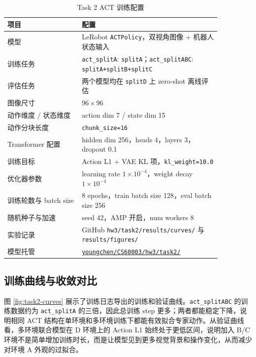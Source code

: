 \documentclass[lang=cn,a4paper,newtx,nofont,code=minted]{elegantpaper}
\begin{document}
\begin{table}[!htbp]
\centering
\small
\caption{Task 2 ACT 训练配置}
\label{tab:task2-config}
\begin{tabular}{@{}L{0.30\linewidth}L{0.56\linewidth}@{}}
\toprule
项目 & 配置 \\
\midrule
模型 & LeRobot \texttt{ACTPolicy}，双视角图像 + 机器人状态输入 \\
训练任务 & \texttt{act\_splitA}: \texttt{splitA}；\texttt{act\_splitABC}: \texttt{splitA+splitB+splitC} \\
评估任务 & 两个模型均在 \texttt{splitD} 上 zero-shot 离线评估 \\
图像尺寸 & $96\times96$ \\
动作维度 / 状态维度 & action dim 7 / state dim 15 \\
动作分块长度 & \texttt{chunk\_size=16} \\
Transformer 配置 & hidden dim 256，heads 4，layers 3，dropout 0.1 \\
训练目标 & Action L1 + VAE KL 项，\texttt{kl\_weight=10.0} \\
优化器参数 & learning rate $1\times10^{-4}$，weight decay $1\times10^{-4}$ \\
训练轮数与 batch size & 8 epochs，train batch size 128，eval batch size 256 \\
随机种子与加速 & seed 42，AMP 开启，num workers 8 \\
实验记录 & GitHub \texttt{hw3/task2/results/curves/} 与 \texttt{results/figures/} \\
模型托管 & \href{https://modelscope.cn/models/youngchen/CS60003/tree/master/hw3/task2}{\texttt{youngchen/CS60003/hw3/task2/}} \\
\bottomrule
\end{tabular}
\end{table}

\subsection{训练曲线与收敛对比}

图 \ref{fig:task2-curves} 展示了训练日志导出的训练和验证曲线。\texttt{act\_splitABC} 的训练数据约为 \texttt{act\_splitA} 的三倍，因此总训练 step 更多；两者都能稳定下降，说明相同 ACT 结构在单环境和多环境训练下都能有效拟合专家动作。从验证曲线看，多环境联合模型在 D 环境上的 Action L1 始终处于更低区间，说明加入 B/C 环境不是简单增加训练时长，而是让模型见到更多视觉背景和操作变化，从而减少对环境 A 外观的过拟合。
\end{document}
